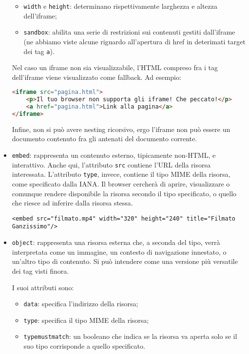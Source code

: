 \documentclass[a4paper,11pt]{article}
\begin{document}
\begin{itemize}
\begin{itemize}
	\item \lstinline|width| e \lstinline|height|: determinano rispettivamente larghezza e altezza dell'iframe;
	\item \lstinline|sandbox|: abilita una serie di restrizioni sui contenuti gestiti dall'iframe (ne abbiamo viste alcune riguardo all'apertura di href in deterimati target dei tag \lstinline|a|).
\end{itemize}

Nel caso un iframe non sia visualizzabile, l'HTML compreso fra i tag dell'iframe viene visualizzato come fallback. Ad esempio:
\begin{lstlisting}[language=html, style=codestyle]	
<iframe src="pagina.html">
	<p>Il tuo browser non supporta gli iframe! Che peccato!</p>
	<a href="pagina.html">Link alla pagina</a>
</iframe>
\end{lstlisting}

Infine, non si può avere nesting ricorsivo, ergo l'iframe non può essere un documento contenuto fra gli antenati del documento corrente.
		
	\item \lstinline|embed|: rappresenta un contenuto esterno, tipicamente non-HTML, e interattivo.
		Anche qui, l'attributo \lstinline|src| contiene l'URL della risorsa interessata.
		L'attributo \lstinline|type|, invece, contiene il tipo MIME della risorsa, come specificato dalla IANA.
		Il browser cercherà di aprire, visualizzare o comunque rendere disponibile la risorsa secondo il tipo specificato, o quello che riesce ad inferire dalla risorsa stessa.
\begin{lstlisting}
<embed src="filmato.mp4" width="320" height="240" title="Filmato Ganzissimo"/>
\end{lstlisting}
	\item \lstinline|object|: rappresenta una risorsa esterna che, a seconda del tipo, verrà interpretata come un immagine, un contesto di navigazione innestato, o un'altro tipo di contenuto. 
		Si può intendere come una versione più versatile dei tag visti finora.

		I suoi attributi sono:
		\begin{itemize}
			\item \lstinline|data|: specifica l'indirizzo della risorsa;
			\item \lstinline|type|: specifica il tipo MIME della risorsa;
			\item \lstinline|typemustmatch|: un booleano che indica se la risorsa va aperta solo se il suo tipo corrisponde a quello specificato. 
		\end{itemize}
		

\end{itemize}
\end{document}
